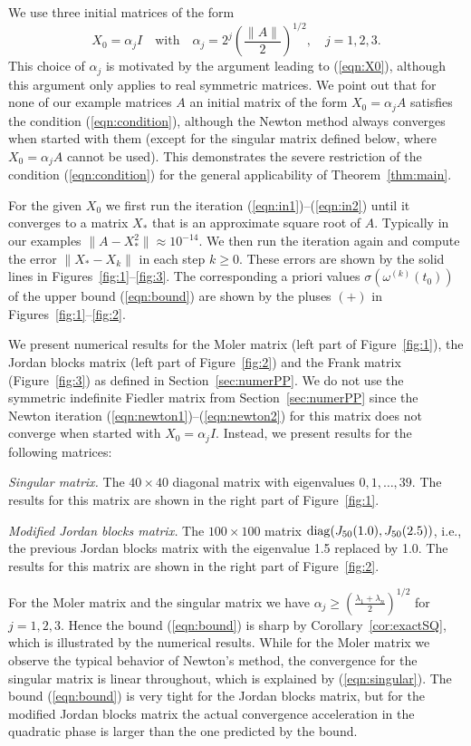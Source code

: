 \documentclass{siamltex}
\begin{document}
We use three initial matrices of the form
$$X_0=\alpha_jI\quad\mbox{with}\quad
\alpha_j=2^j \left(\frac{\|A\|}{2}\right)^{1/2},\quad j=1,2,3.$$
This choice of $\alpha_j$ is motivated by the argument leading to (\ref{eqn:X0}),
although this argument only applies to real symmetric matrices.
We point out that for none of our example matrices $A$ an initial matrix
of the form $X_0=\alpha_j A$ satisfies the condition (\ref{eqn:condition}), although
the Newton method always converges when started with them (except for the singular matrix
defined below, where $X_0=\alpha_j A$ cannot be used). This demonstrates the severe restriction
of the condition (\ref{eqn:condition}) for the general applicability of Theorem~\ref{thm:main}.

For the given $X_0$ we first run the iteration (\ref{eqn:in1})--(\ref{eqn:in2}) until it converges
to a matrix $X_*$ that is an approximate square root of $A$. Typically in our examples
$\|A-X_*^2\|\approx 10^{-14}$. We then run the iteration again and compute the error
$\|X_*-X_k\|$ in each step $k\geq 0$. These errors are shown by the solid lines in
Figures~\ref{fig:1}--\ref{fig:3}. The corresponding a priori values $\sigma(\omega^{(k)}(t_0))$
of the upper bound (\ref{eqn:bound}) are shown by the pluses $(+)$ in Figures~\ref{fig:1}--\ref{fig:2}.

We present numerical results for the Moler matrix (left part of Figure~\ref{fig:1}),
the Jordan blocks matrix (left part of Figure~\ref{fig:2}) and the Frank matrix
(Figure~\ref{fig:3}) as defined in Section~\ref{sec:numerPP}. We do not use the 
symmetric indefinite Fiedler matrix from Section~\ref{sec:numerPP} since the Newton 
iteration (\ref{eqn:newton1})--(\ref{eqn:newton2}) for this matrix does not converge 
when started with $X_0=\alpha_j I$. Instead, we present results for
the following matrices:

\smallskip
{\em Singular matrix.\/} The $40\times 40$ diagonal matrix with eigenvalues $0,1,\dots,39$.
The results for this matrix are shown in the right part of Figure~\ref{fig:1}.

\smallskip
{\em Modified Jordan blocks matrix.\/} The $100\times 100$ matrix ${\rm diag}(J_{50}(1.0),J_{50}(2.5))$,
i.e., the previous Jordan blocks matrix with the eigenvalue 1.5 replaced by 1.0. The results
for this matrix are shown in the right part of Figure~\ref{fig:2}.

\smallskip
For the Moler matrix and the singular matrix we have
$\alpha_j \geq \left(\frac{\lambda_1+\lambda_n}{2}\right)^{1/2}$ for $j=1,2,3$.
Hence the bound (\ref{eqn:bound}) is sharp by Corollary~\ref{cor:exactSQ},
which is illustrated by the numerical results. While for the Moler matrix we observe the typical
behavior of Newton's method, the convergence for the singular matrix is linear throughout,
which is explained by (\ref{eqn:singular}). The bound (\ref{eqn:bound}) is very tight
for the Jordan blocks matrix, but for the modified Jordan blocks matrix the actual
convergence acceleration in the quadratic phase is larger than the one predicted by
the bound.
\end{document}
